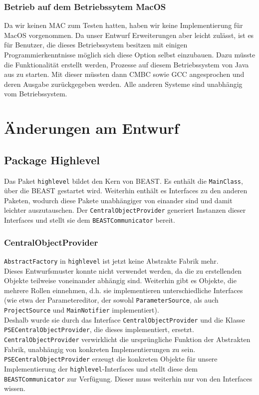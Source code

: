 \documentclass[a4paper]{scrreprt}
\begin{document}
\subsection{Betrieb auf dem Betriebssytem MacOS} 
Da wir keinen MAC zum Testen hatten, haben wir keine Implementierung für MacOS
vorgenommen. Da unser Entwurf Erweiterungen aber leicht zulässt, ist es für
Benutzer, die dieses Betriebssystem besitzen mit einigen Programmierkenntnisse
möglich sich diese Option selbst einzubauen. Dazu müsste die Funktionalität erstellt werden, Prozesse auf diesem Betriebssystem von Java aus zu starten. Mit dieser müssten dann CMBC sowie GCC angesprochen und deren Ausgabe zurückgegeben werden. Alle anderen Systeme sind unabhängig vom Betriebssystem.

\chapter{Änderungen am Entwurf}
\section{Package Highlevel}

Das Paket \verb!highlevel! bildet den Kern von BEAST. Es enthält die \verb!MainClass!, über die BEAST gestartet wird. Weiterhin enthält es Interfaces zu den anderen Paketen, wodurch diese Pakete unabhängiger von einander sind und damit leichter auszutauschen. Der \verb!CentralObjectProvider! generiert Instanzen dieser Interfaces und stellt sie dem \verb!BEASTCommunicator! bereit. \\

\subsection{CentralObjectProvider}
\verb!AbstractFactory! in \verb!highlevel! ist jetzt keine Abstrakte Fabrik mehr.\\ Dieses Entwurfsmuster konnte nicht verwendet werden, da die zu erstellenden Objekte teilweise voneinander abhängig sind. Weiterhin gibt es Objekte, die mehrere Rollen einnehmen, d.h. sie implementieren unterschiedliche Interfaces (wie etwa der Parametereditor, der sowohl \verb!ParameterSource!, als auch \verb!ProjectSource! und \verb!MainNotifier! implementiert). \\
Deshalb wurde sie durch das Interface \verb!CentralObjectProvider! und die Klasse\\ \verb!PSECentralObjectProvider!, die dieses implementiert, ersetzt. \verb!CentralObjectProvider! verwirklicht die ursprüngliche Funktion der Abstrakten Fabrik, unabhängig von konkreten Implementierungen zu sein. \\
\verb!PSECentralObjectProvider! erzeugt die konkreten Objekte für unsere Implementierung der \verb!highlevel!-Interfaces und stellt diese dem \verb!BEASTCommunicator! zur Verfügung. Dieser muss weiterhin nur von den Interfaces wissen. \\
\end{document}
